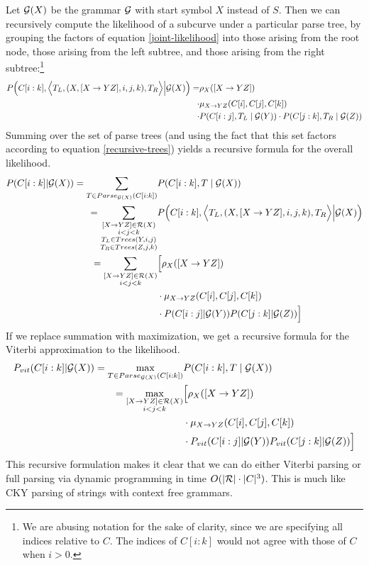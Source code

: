 \documentclass{article}
\begin{document}
Let ${\mathcal G}(X)$ be the grammar ${\mathcal G}$ with start symbol $X$ instead of
$S$. Then we can recursively compute the likelihood of a subcurve
under a particular parse tree, by grouping the factors of equation
\eqref{joint-likelihood} into those arising from the root node, those
arising from the left subtree, and those arising from the right
subtree:\footnote{We are abusing notation for the sake of clarity,
  since we are specifying all indices relative to $C$. The indices of
  $C[i:k]$ would not agree with those of $C$ when $i>0$. }
\begin{align*}
P\Big(C[i:k], \Big\langle T_L, (X, [X\to YZ], i,j,k), T_R \Big\rangle \Big| {\mathcal G}(X)\Big) = &\rho_X([X\to YZ])  \\
\cdot &\mu_{X\to YZ}(C[i],C[j],C[k]) \\
\cdot &P(C[i:j], T_L \mid {\mathcal G}(Y)) \cdot P(C[j:k], T_R \mid {\mathcal G}(Z))
\end{align*}
Summing over the set of parse trees (and using the fact that this set
factors according to equation \eqref{recursive-trees}) yields a recursive formula for the overall likelihood.
\begin{align*}
P(C[i:k] | {\mathcal G}(X)) = \sum_{T\in Parse_{{\mathcal G}(X)}(C[i:k])} & P(C[i:k], T \mid {\mathcal G}(X))\\
= \sum_{\substack{[X\to YZ] \in {\mathcal R}(X)\\i < j < k\\ T_L\in Trees(Y,i,j)\\ T_R\in Trees(Z,j,k)}} &P\Big(C[i:k], \Big\langle T_L, (X, [X\to YZ], i,j,k), T_R \Big\rangle \Big| {\mathcal G}(X)\Big)\\
= \sum_{\substack{[X\to YZ] \in {\mathcal R}(X)\\i < j < k}} &\Big[\rho_X([X\to YZ]) \\
&\cdot \mu_{X\to YZ}(C[i],C[j],C[k]) \\
&\cdot P(C[i:j] | {\mathcal G}(Y)) P(C[j:k] | {\mathcal G}(Z))\Big]
\end{align*}
If we replace summation with maximization, we get a recursive formula
for the Viterbi approximation to the likelihood.
\begin{align*}
P_{vit}(C[i:k] | {\mathcal G}(X)) = \max_{T\in Parse_{{\mathcal G}(X)}(C[i:k])} & P(C[i:k], T \mid {\mathcal G}(X))\\
= \max_{\substack{[X\to YZ] \in {\mathcal R}(X)\\i < j < k}} &\Big[\rho_X([X\to YZ]) \\
&\cdot \mu_{X\to YZ}(C[i],C[j],C[k]) \\
&\cdot P_{vit}(C[i:j] | {\mathcal G}(Y)) P_{vit}(C[j:k] | {\mathcal G}(Z))\Big]
\end{align*}
This recursive formulation makes it clear that we can do either
Viterbi parsing or full parsing via dynamic programming in time
$O(|{\mathcal R}|\cdot |C|^3)$. This is much like CKY parsing of strings with
context free grammars.
\end{document}
